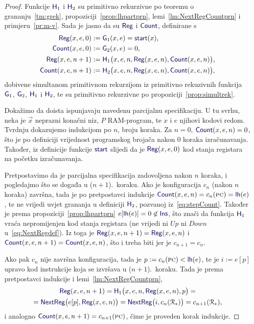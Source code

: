 \begin{proof}
Funkcije $\f H_1$ i $\f H_2$ su primitivno rekurzivne po teoremu o grananju~\ref{tm:grek}, propoziciji~\ref{prop:lhpartprn}, lemi~\ref{lm:NextRegCountprn} i primjeru~\ref{pr:m-v}. Sada je jasno da su $\f{Reg}$ i $\f{Count}$, definirane s
\begin{align}
    \f{Reg}(x,e,0)&:=\f G_1(x,e)=\f{start}(x)\text,\\
    \f{Count}(x,e,0)&:=\f G_2(x,e)=0\text,\\
    \label{eq:stepReg}\f{Reg}(x,e,n+1)&:=\f H_1\bigl(x,e,n,\f{Reg}(x,e,n),\f{Count}(x,e,n)\bigr)\text,\\
    \label{eq:stepCount}\f{Count}(x,e,n+1)&:=\f H_2\bigl(x,e,n,\f{Reg}(x,e,n),\f{Count}(x,e,n)\bigr)\text,
\end{align}
dobivene simultanom primitivnom rekurzijom iz primitivno rekuzivnih funkcija $\f G_1$, $\f G_2$, $\f H_1$ i $\f H_2$, te su primitivno rekurzivne po propoziciji~\ref{prop:simultrek}.

Dokažimo da doista ispunjavaju navedenu parcijalnu specifikaciju. U tu svrhu, neka je $\vec x$ neprazni konačni niz, $P$ RAM-program, te $x$ i $e$ njihovi kodovi redom. Tvrdnju dokazujemo indukcijom po $n$, broju koraka. Za $n=0$, $\f{Count}(x,e,n)=0$, što je po definiciji vrijednost programskog brojača nakon $0$ koraka izračunavanja. Također, iz definicije funkcije $\f{start}$ slijedi da je $\f{Reg}(x,e,0)$ kod stanja registara na početku izračunavanja.

Pretpostavimo da je parcijalna specifikacija zadovoljena nakon $n$ koraka, i pogledajmo što se događa u ($n+1$).\ koraku. Ako je konfiguracija $c_n$ (nakon $n$ koraka) završna, tada je po pretpostavci indukcije $\f{Count}(x,e,n)=c_n(\textsc{pc})=\f{lh}(e)$, te ne vrijedi uvjet grananja u definiciji $\f H_2$, pozvanoj  iz~\eqref{eq:stepCount}. Također je prema propoziciji~\ref{prop:lhpartprn} $e[\f{lh}(e)]=0\not\in\f{Ins}$, što znači da funkcija $\f H_1$ vraća nepromijenjen kod stanja registara (ne vrijedi ni $Up$ ni $Down$ u~\eqref{eq:NextRegdef}). Iz toga je $\f{Reg}(x,e,n+1)=\f{Reg}(x,e,n)$ i $\f{Count}(x,e,n+1)=\f{Count}(x,e,n)$, što i treba biti jer je $c_{n+1}=c_n$.

Ako pak $c_n$ nije završna konfiguracija, tada je $p:=c_n(\textsc{pc})<\f{lh}(e)$, te je $i:=e[p]$ upravo kod instrukcije koja se izvršava u ($n+1$).\ koraku. Tada je prema pretpostavci indukcije i lemi~\ref{lm:NextRegCountprn},
\begin{multline}
    \f{Reg}(x,e,n+1)=\f H_1\bigl(x,e,n,\f{Reg}(x,e,n),p\bigr)=\\
    =\f{NextReg}\bigl(e[p],\f{Reg}(x,e,n)\bigr)=\f{NextReg}\bigl(i,c_n(\reg{*})\bigr)=c_{n+1}(\reg{*})\text,
\end{multline}
i analogno $\f{Count}(x,e,n+1)=c_{n+1}(\textsc{pc})$, čime je proveden korak indukcije.
\end{proof}

